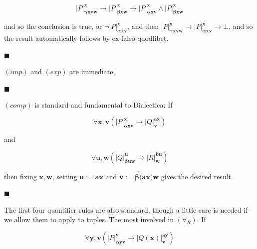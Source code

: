 \par  \quad  \[|{P}|^{\bm{x}}_{\bm{\gamma}\bm{x}\bm{v}\bm{w}}\to|{P}|^{\bm{x}}_{\bm{\beta}\bm{x}\bm{w}}\to|{P}|^{\bm{x}}_{\bm{\alpha}\bm{x}\bm{v}}\wedge|{P}|^{\bm{x}}_{\bm{\beta}\bm{x}\bm{w}}\]\quad  \quad  
  
and so the conclusion is true, or $\neg|{P}|^{\bm{x}}_{\bm{\alpha}\bm{x}\bm{v}}$, and then $|{P}|^{\bm{x}}_{\bm{\gamma}\bm{x}\bm{v}\bm{w}}\to|{P}|^{\bm{x}}_{\bm{\alpha}\bm{x}\bm{v}}\to\bot$, and so the result automatically follows by ex-falso-quodlibet.\par
 
 
 
\par\noindent  $\blacksquare$ 
 
$(imp)$ and $(exp)$ are immediate.\par
 
 
 
\par\noindent  $\blacksquare$ 
 
$(comp)$ is standard and fundamental to Dialectica: If\par
  
\par  \quad  \[\forall\bm{x},\bm{v}\left(|{P}|^{\bm{x}}_{\bm{\alpha}\bm{x}\bm{v}}\to|{Q}|^{\bm{a}\bm{x}}_{\bm{v}}\right)\]\quad  \quad  
  
and\par
  
\par  \quad  \[\forall\bm{u},\bm{w}\left(|{Q}|^{\bm{u}}_{\bm{\beta}\bm{u}\bm{w}}\to|{R}|^{\bm{b}\bm{u}}_{\bm{w}}\right)\]\quad  \quad  
  
then fixing $\bm{x},\bm{w}$, setting $\bm{u}:=\bm{a}\bm{x}$ and $\bm{v}:=\bm{\beta}\bm{(}\bm{a}\bm{x})\bm{w}$ gives the desired result.\par
 
 
 
\par\noindent  $\blacksquare$ 
 
The first four quantifier rules are also standard, though a little care is needed if we allow them to apply to tuples. The most involved in $(\forall_{R})$. If\par
  
\par  \quad  \[\forall\bm{y},\bm{v}\left(|{P}|^{\bm{y}}_{\bm{\alpha}\bm{y}\bm{v}}\to|{Q(\bm{x})}|^{\bm{a}\bm{y}}_{\bm{v}}\right)\]\quad  \quad  
  
